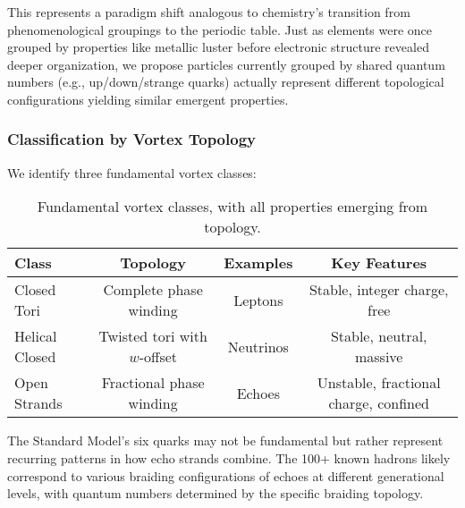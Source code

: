 This represents a paradigm shift analogous to chemistry's transition from phenomenological groupings to the periodic table. Just as elements were once grouped by properties like metallic luster before electronic structure revealed deeper organization, we propose particles currently grouped by shared quantum numbers (e.g., up/down/strange quarks) actually represent different topological configurations yielding similar emergent properties.

\subsubsection{Classification by Vortex Topology}

We identify three fundamental vortex classes:

\begin{table}[h!]
\centering
\begin{tabular}{|l|c|c|c|}
\hline
Class & Topology & Examples & Key Features \\
\hline
Closed Tori & Complete phase winding & Leptons & Stable, integer charge, free \\
Helical Closed & Twisted tori with $w$-offset & Neutrinos & Stable, neutral, massive \\
Open Strands & Fractional phase winding & Echoes & Unstable, fractional charge, confined \\
\hline
\end{tabular}
\caption{Fundamental vortex classes, with all properties emerging from topology.}
\end{table}

The Standard Model's six quarks may not be fundamental but rather represent recurring patterns in how echo strands combine. The 100+ known hadrons likely correspond to various braiding configurations of echoes at different generational levels, with quantum numbers determined by the specific braiding topology.

